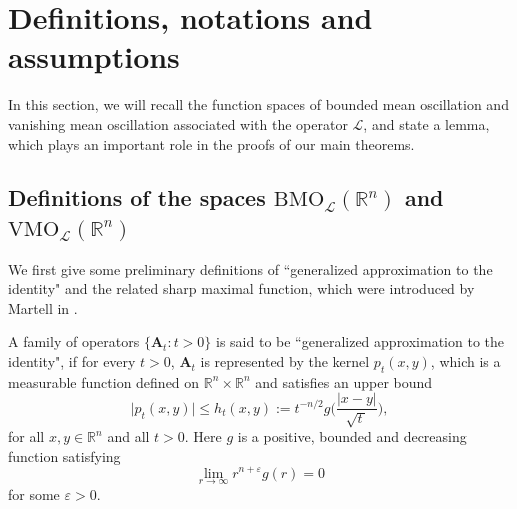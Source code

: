 \documentclass[10pt, reqno]{amsart}
\theoremstyle{definition}
\theoremstyle{remark}
\numberwithin{equation}{section}
\begin{document}
\section{Definitions, notations and assumptions}
\label{sec2}
In this section, we will recall the function spaces of bounded mean oscillation and vanishing mean oscillation associated with the operator $\mathcal{L}$, and state a lemma, which plays an important role in the proofs of our main theorems.
\subsection{Definitions of the spaces $\mathrm{BMO}_{\mathcal{L}}(\mathbb R^n)$ and $\mathrm{VMO}_{\mathcal{L}}(\mathbb R^n)$}
We first give some preliminary definitions of ``generalized approximation to the identity" and the related sharp maximal function, which were introduced by Martell in \cite{martell}.

A family of operators $\{\mathbf{A}_t:t>0\}$ is said to be ``generalized approximation to the identity", if for every $t>0$, $\mathbf{A}_t$ is represented by the kernel $p_t(x,y)$, which is a measurable function defined on $\mathbb R^n\times \mathbb R^n$ and satisfies an upper bound
\begin{equation*}
\big|p_t(x,y)\big|\leq h_t(x,y):=t^{-n/2}g\bigg(\frac{|x-y|}{\sqrt{t\,}}\bigg),
\end{equation*}
for all $x,y\in\mathbb R^n$ and all $t>0$. Here $g$ is a positive, bounded and decreasing function satisfying
\begin{equation}\label{15}
\lim_{r\to\infty}r^{n+\varepsilon}g(r)=0
\end{equation}
for some $\varepsilon>0$.
\end{document}
